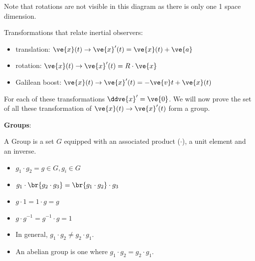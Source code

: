 \documentclass{article}
\newcommand{\heading}[1]{\vspace{0.1in}\textbf{#1}:}
\begin{document}
\begin{center}
\end{center}

Note that rotations are not visible in this diagram as there is only one 1 space dimension.

Transformations that relate inertial observers:
\begin{itemize}
    \item translation: $\ve{x}(t) \to \ve{x}'(t) = \ve{x}(t) + \ve{a}$
    \item rotation: $\ve{x}(t) \to \ve{x}'(t) = R \cdot \ve{x}$
    \item Galilean boost: $\ve{x}(t) \to \ve{x}'(t) = - \ve{v}t  + \ve{x}(t)$
\end{itemize}

For each of these transformations $\ddve{x}' = \ve{0}$. We will now prove the set of all these transformation of $\ve{x}(t) \to \ve{x}'(t)$ form a group.

\heading{Groups}

A Group is a set $G$ equipped with an associated product ($\cdot$), a unit element and an inverse.

\begin{itemize}
    \item $g_1 \cdot g_2 = g \in G, g_i \in G$
    \item $g_1 \cdot \br{g_2 \cdot g_3} = \br{g_1 \cdot g_2} \cdot g_3$
    \item $g \cdot 1 = 1 \cdot g = g$
    \item $g \cdot g^{-1} = g^{-1} \cdot g = 1$
    \item In general, $g_1 \cdot g_2 \neq g_2 \cdot g_1$.
    \item An abelian group is one where $g_1 \cdot g_2 = g_2 \cdot g_1$.
\end{itemize}
\end{document}
